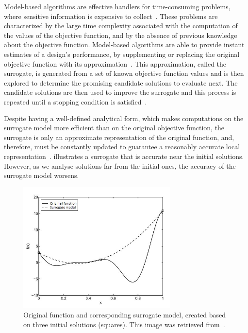	Model-based algorithms are effective handlers for time-consuming problems, where sensitive information is expensive to collect~\cite{Forrester2009SBO}. These problems are characterized by the large time complexity associated with the computation of the values of the objective function, and by the absence of previous knowledge about the objective function. Model-based algorithms are able to provide instant estimates of a design’s performance, by supplementing or replacing the original objective function with its approximation~\cite{Wortmann2016BBO}. This approximation, called the surrogate, is generated from a set of known objective function values and is then explored to determine the promising candidate solutions to evaluate next. The candidate solutions are then used to improve the surrogate and this process is repeated until a stopping condition is satisfied~\cite{Koziel2011}.
	
	Despite having a well-defined analytical form, which makes computations on the surrogate model more efficient than on the original objective function, the surrogate is only an approximate representation of the original function, and, therefore, must be constantly updated to guarantee a reasonably accurate local representation~\cite{Koziel2011}.  illustrates a surrogate that is accurate near the initial solutions. However, as we analyse solutions far from the initial ones, the accuracy of the surrogate model worsens.
	
	\begin{figure}
		\centering
		\includegraphics[width=8cm]{Images/Background/sbosexample.JPG}
		\caption[Example of a surrogate model]{Original function and corresponding surrogate model, created based on three initial solutions (squares). This image was retrieved from~\cite{Koziel2011}.}
		\label{fig:sbosexample}
	\end{figure}
	
